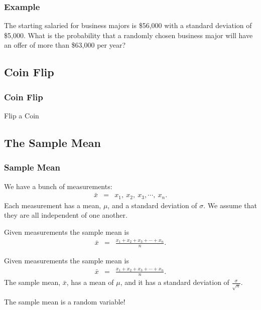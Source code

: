 \begin{frame}
  \frametitle{Example}

  The starting salaried for business majors is \$56,000 with a
  standard deviation of \$5,000. What is the probability that a
  randomly chosen business major will have an offer of more than
  \$63,000 per year?

\end{frame}




\subsection{Coin Flip}

\begin{frame}
  \frametitle{Coin Flip}

  Flip a Coin





\end{frame}

\subsection{The Sample Mean}

\begin{frame}
  \frametitle{Sample Mean}

  We have a bunch of measurements:
  \begin{eqnarray*}
    \bar{x} & = & x_1,~x_2,~x_3,\cdots,~x_n.
  \end{eqnarray*}
  Each measurement has a mean, $\mu$, and a standard deviation of
  $\sigma$. We assume that they are all independent of one another.
  
  {
    \begin{definition}
      Given measurements the sample mean is 
      \begin{eqnarray*}
        \bar{x} & = & \frac{x_1+x_2+x_3+\cdots+x_n}{n}.
      \end{eqnarray*}
    \end{definition}
  }

  {
    \begin{definition}
      Given measurements the sample mean is 
      \begin{eqnarray*}
        \bar{x} & = & \frac{x_1+x_2+x_3+\cdots+x_n}{n}.
      \end{eqnarray*}
      The sample mean, $\bar{x}$,  has a mean of $\mu$, and it has a
      standard deviation of $\frac{\sigma}{\sqrt{n}}$.
    \end{definition}
  }


  {
    The sample mean is a random variable!
  }

\end{frame}


